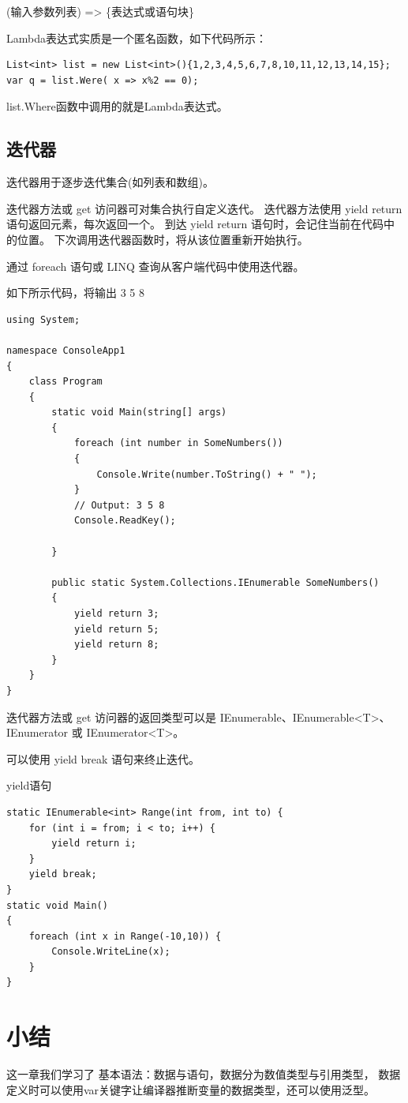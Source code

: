 (输入参数列表) => \{表达式或语句块\}

Lambda表达式实质是一个匿名函数，如下代码所示：
\begin{lstlisting}
List<int> list = new List<int>(){1,2,3,4,5,6,7,8,10,11,12,13,14,15};
var q = list.Were( x => x%2 == 0);
\end{lstlisting}
list.Where函数中调用的就是Lambda表达式。

\subsection{迭代器}

迭代器用于逐步迭代集合(如列表和数组)。

迭代器方法或 get 访问器可对集合执行自定义迭代。 迭代器方法使用 yield return 语句返回元素，每次返回一个。 到达 yield return 语句时，会记住当前在代码中的位置。 下次调用迭代器函数时，将从该位置重新开始执行。

通过 foreach 语句或 LINQ 查询从客户端代码中使用迭代器。

如下所示代码，将输出 3 5 8

\begin{lstlisting}
using System;

namespace ConsoleApp1
{
    class Program
    {
        static void Main(string[] args)
        {
            foreach (int number in SomeNumbers())
            {
                Console.Write(number.ToString() + " ");
            }
            // Output: 3 5 8
            Console.ReadKey();

        }

        public static System.Collections.IEnumerable SomeNumbers()
        {
            yield return 3;
            yield return 5;
            yield return 8;
        }
    }
}
\end{lstlisting}

迭代器方法或 get 访问器的返回类型可以是 IEnumerable、IEnumerable<T>、IEnumerator 或 IEnumerator<T>。

可以使用 yield break 语句来终止迭代。

yield语句

\begin{lstlisting}
static IEnumerable<int> Range(int from, int to) {
    for (int i = from; i < to; i++) {
        yield return i;
    }
    yield break;
}
static void Main()
{
    foreach (int x in Range(-10,10)) {
        Console.WriteLine(x);
    }
}
\end{lstlisting}

\section{小结}
这一章我们学习了 \cs 基本语法：数据与语句，数据分为数值类型与引用类型，
数据定义时可以使用var关键字让编译器推断变量的数据类型，还可以使用泛型。

